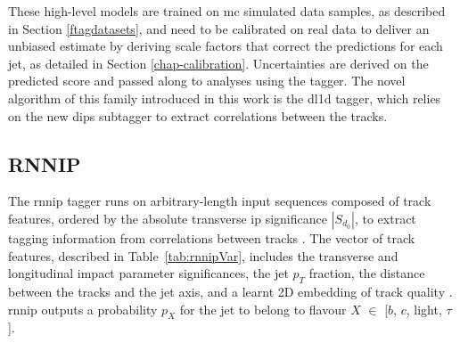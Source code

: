 These high-level models are trained on \gls{mc} simulated data samples, as described in Section \ref{ftagdatasets}, and need to be calibrated on real data to deliver an unbiased estimate by deriving scale factors that correct the predictions for each jet, as detailed in Section \ref{chap-calibration}. Uncertainties are derived on the predicted score and passed along to analyses using the tagger. The novel algorithm of this family introduced in this work is the \gls{dl1d} tagger, which relies on the new \gls{dips} subtagger to extract correlations between the tracks.  

\subsection{RNNIP}
The \gls{rnnip} tagger runs on arbitrary-length input sequences composed of track features, ordered by the absolute transverse \gls{ip} significance $|S_{d_0}|$, to extract tagging information from correlations between tracks \cite{ATL-PHYS-PUB-2017-003}. The vector of track features, described in Table~\ref{tab:rnnipVar}, includes the transverse and longitudinal impact parameter significances, the jet $p_T$ fraction, the distance between the tracks and the jet axis, and a learnt 2D embedding of track quality \cite{Paganini:2289214}. \gls{rnnip} outputs a probability $p_X$ for the jet to belong to flavour $X$ $\in$ [$b$, $c$, light, $\tau$]. 

